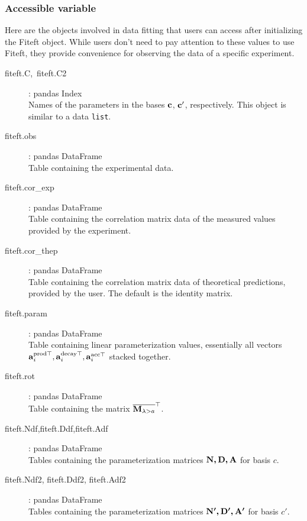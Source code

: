 \documentclass[12pt]{article}
\def\b#1{\boldsymbol{\rm #1}}
\begin{document}
\subsubsection{Accessible variable }
Here are the objects involved in data fitting that users can access after initializing the Fiteft object. While users don't need to pay attention to these values to use Fiteft, they provide convenience for observing the data of a specific experiment.
\begin{description}
  \item[fiteft.C,\ fiteft.C2]: pandas Index\\
  Names of the parameters in the bases $\b c$, $\b c'$, respectively. This object is similar to a data \verb|list|.
  \item[fiteft.obs]: pandas DataFrame\\
  Table containing the experimental data.
  \item[fiteft.cor\_exp]:  pandas DataFrame\\
  Table containing the correlation matrix data of the measured values provided by the experiment.
  \item[fiteft.cor\_thep]:  pandas DataFrame\\
  Table containing the correlation matrix data of theoretical predictions, provided by the user. The default is the identity matrix.
  \item[fiteft.param]:  pandas DataFrame\\
  Table containing linear parameterization values, essentially all vectors  $\b a_i^{\text{prod}\top},\b a_i^{\text{decay}\top},\b a_i^{\text{acc}\top}$ stacked together.
  \item[fiteft.rot] : pandas DataFrame\\
  Table containing the matrix $\overline{\b M_{\lambda >a}}^\top$.
  \item[fiteft.Ndf,fiteft.Ddf,fiteft.Adf] : pandas DataFrame\\
  Tables containing the parameterization matrices $\b{N,D,A}$ for basis $c$.
  \item[fiteft.Ndf2, fiteft.Ddf2, fiteft.Adf2] : pandas DataFrame\\
  Tables containing the parameterization matrices $\b{N',D',A'}$ for basis $c'$.
\end{description}
\end{document}
